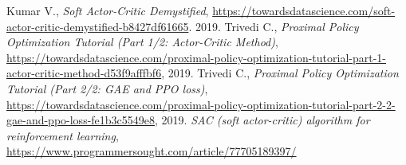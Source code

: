 \documentclass[a4paper,12pt]{article}
\begin{document}
\begin{thebibliography}{20}
	Kumar V., \textit{Soft Actor-Critic Demystified}, \url{https://towardsdatascience.com/soft-actor-critic-demystified-b8427df61665}. 2019.
	 Trivedi C., \textit{Proximal Policy Optimization Tutorial (Part 1/2: Actor-Critic Method)}, \url{https://towardsdatascience.com/proximal-policy-optimization-tutorial-part-1-actor-critic-method-d53f9afffbf6}, 2019.
	 Trivedi C., \textit{Proximal Policy Optimization Tutorial (Part 2/2: GAE and PPO loss)}, \url{https://towardsdatascience.com/proximal-policy-optimization-tutorial-part-2-2-gae-and-ppo-loss-fe1b3c5549e8}, 2019.
	 \textit{SAC (soft actor-critic) algorithm for reinforcement learning}, \url{https://www.programmersought.com/article/77705189397/}
\end{thebibliography}
\end{document}
